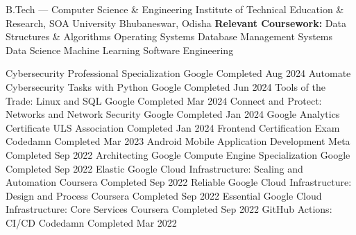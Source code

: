 \documentclass{bhaumic}
\begin{document}
\eduentry
  {B.Tech — Computer Science \& Engineering}
  {Institute of Technical Education \& Research, SOA University}
  {Bhubaneswar, Odisha}
  {}
\vspace{1pt}
{\small\color{bodytext}%
  \textbf{Relevant Coursework:}
  Data Structures \& Algorithms \textbullet{}
  Operating Systems \textbullet{}
  Database Management Systems \textbullet{}
  Data Science \textbullet{}
  Machine Learning \textbullet{}
  Software Engineering \textbullet{}
}


\certrow
  {Cybersecurity Professional Specialization}
  {Google}
  {Completed}
  {Aug 2024}
\certrow
  {Automate Cybersecurity Tasks with Python}
  {Google}
  {Completed}
  {Jun 2024}
\certrow
  {Tools of the Trade: Linux and SQL}
  {Google}
  {Completed}
  {Mar 2024}
\certrow
  {Connect and Protect: Networks and Network Security}
  {Google}
  {Completed}
  {Jan 2024}
\certrow
  {Google Analytics Certificate}
  {ULS Association}
  {Completed}
  {Jan 2024}
\certrow
  {Frontend Certification Exam}
  {Codedamn}
  {Completed}
  {Mar 2023}
\certrow
  {Android Mobile Application Development}
  {Meta}
  {Completed}
  {Sep 2022}
\certrow
  {Architecting Google Compute Engine Specialization}
  {Google}
  {Completed}
  {Sep 2022}
\certrow
  {Elastic Google Cloud Infrastructure: Scaling and Automation}
  {Coursera}
  {Completed}
  {Sep 2022}
\certrow
  {Reliable Google Cloud Infrastructure: Design and Process}
  {Coursera}
  {Completed}
  {Sep 2022}
\certrow
  {Essential Google Cloud Infrastructure: Core Services}
  {Coursera}
  {Completed}
  {Sep 2022}
\certrow
  {GitHub Actions: CI/CD}
  {Codedamn}
  {Completed}
  {Mar 2022}
\end{document}
